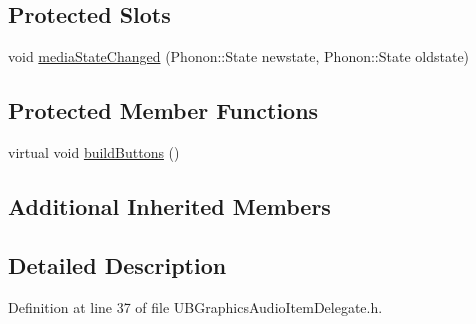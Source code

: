 \subsection*{Protected Slots}
\begin{DoxyCompactItemize}
\item 
void \hyperlink{class_u_b_graphics_audio_item_delegate_a79a9ce4b01259e1cdbcebdfcbeec328f}{media\-State\-Changed} (Phonon\-::\-State newstate, Phonon\-::\-State oldstate)
\end{DoxyCompactItemize}
\subsection*{Protected Member Functions}
\begin{DoxyCompactItemize}
\item 
virtual void \hyperlink{class_u_b_graphics_audio_item_delegate_ad8e9a598081a5ade9092d80784297c3c}{build\-Buttons} ()
\end{DoxyCompactItemize}
\subsection*{Additional Inherited Members}


\subsection{Detailed Description}


Definition at line 37 of file U\-B\-Graphics\-Audio\-Item\-Delegate.\-h.



